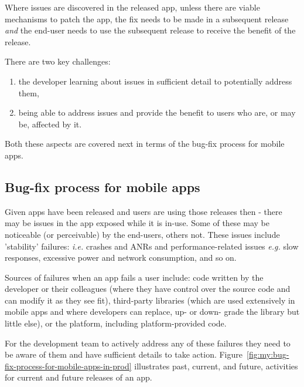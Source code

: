 Where issues are discovered in the released app, unless there are viable mechanisms to patch the app, the fix needs to be made in a subsequent release \emph{and} the end-user needs to use the subsequent release to receive the benefit of the release.

There are two key challenges:
\begin{enumerate}
    \item the developer learning about issues in sufficient detail to potentially address them,
    \item being able to address issues and provide the benefit to users who are, or  may be, affected by it.
\end{enumerate}

Both these aspects are covered next in terms of the bug-fix process for mobile apps.

\subsection{Bug-fix process for mobile apps}

Given apps have been released and users are using those releases then - there may be issues in the app exposed while it is in-use. Some of these may be noticeable (or perceivable) by the end-users, others not. These issues include 'stability' failures: \emph{i.e.} crashes and ANRs and performance-related issues \emph{e.g.} slow responses, excessive power and network consumption, and so on.

Sources of failures when an app fails a user include: code written by the developer or their colleagues (where they have control over the source code and can modify it as they see fit), third-party libraries (which are used extensively in mobile apps and where developers can replace, up- or down- grade the library but little else), or the platform, including platform-provided code.

For the development team to actively address any of these failures they need to be aware of them and have sufficient details to take action. Figure~\ref{fig:my:bug-fix-process-for-mobile-apps-in-prod} illustrates past, current, and future, activities for current and future releases of an app. 

